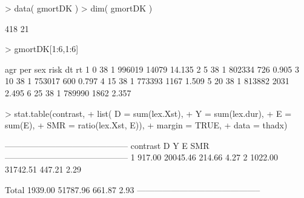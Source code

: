 \begin{frame}[fragile]
\begin{Schunk}
\begin{Sinput}
> data( gmortDK )
> dim( gmortDK )
\end{Sinput}
\begin{Soutput}
[1] 418  21
\end{Soutput}
\begin{Sinput}
> gmortDK[1:6,1:6]
\end{Sinput}
\begin{Soutput}
  agr per sex   risk    dt     rt
1   0  38   1 996019 14079 14.135
2   5  38   1 802334   726  0.905
3  10  38   1 753017   600  0.797
4  15  38   1 773393  1167  1.509
5  20  38   1 813882  2031  2.495
6  25  38   1 789990  1862  2.357
\end{Soutput}
\end{Schunk}
\end{frame}

\begin{frame}[fragile]
\begin{Schunk}
\begin{Sinput}
> stat.table(contrast,
+            list( D = sum(lex.Xst),
+                  Y = sum(lex.dur),
+                  E = sum(E),
+                SMR = ratio(lex.Xst, E)),
+             margin = TRUE,
+               data = thadx)
\end{Sinput}
\begin{Soutput}
 -------------------------------------------- 
 contrast         D        Y       E     SMR  
 -------------------------------------------- 
 1           917.00 20045.46  214.66    4.27  
 2          1022.00 31742.51  447.21    2.29  
                                              
 Total      1939.00 51787.96  661.87    2.93  
 -------------------------------------------- 
\end{Soutput}
\end{Schunk}
\end{frame}

